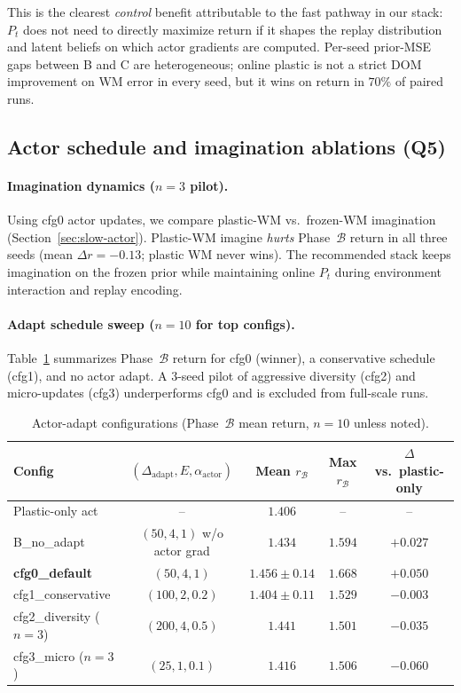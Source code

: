 This is the clearest \emph{control} benefit attributable to the fast pathway in our stack: $P_t$ does not need to directly maximize return if it shapes the replay distribution and latent beliefs on which actor gradients are computed.
Per-seed prior-MSE gaps between B and C are heterogeneous; online plastic is not a strict DOM improvement on WM error in every seed, but it wins on return in $70\%$ of paired runs.

\subsection{Actor schedule and imagination ablations (Q5)}
\label{sec:exp-actor-sweep}

\paragraph{Imagination dynamics ($n{=}3$ pilot).}
Using cfg0 actor updates, we compare plastic-WM vs.\ frozen-WM imagination (Section~\ref{sec:slow-actor}).
Plastic-WM imagine \emph{hurts} Phase~$\mathcal{B}$ return in all three seeds (mean $\Delta r = -0.13$; plastic WM never wins).
The recommended stack keeps imagination on the frozen prior while maintaining online $P_t$ during environment interaction and replay encoding.

\paragraph{Adapt schedule sweep ($n{=}10$ for top configs).}
Table~\ref{tab:cfg-sweep} summarizes Phase~$\mathcal{B}$ return for cfg0 (winner), a conservative schedule (cfg1), and no actor adapt.
A $3$-seed pilot of aggressive diversity (cfg2) and micro-updates (cfg3) underperforms cfg0 and is excluded from full-scale runs.

\begin{table}[t]
  \centering
  \caption{Actor-adapt configurations (Phase~$\mathcal{B}$ mean return, $n{=}10$ unless noted).}
  \label{tab:cfg-sweep}
  \begin{tabular}{@{}lcccc@{}}
    \toprule
    Config & $(\Delta_{\mathrm{adapt}}, E, \alpha_{\mathrm{actor}})$ & Mean $r_{\mathcal{B}}$ & Max $r_{\mathcal{B}}$ & $\Delta$ vs.\ plastic-only \\
    \midrule
    Plastic-only act & -- & $1.406$ & -- & -- \\
    B\_no\_adapt & $(50,4,1)$ w/o actor grad & $1.434$ & $1.594$ & $+0.027$ \\
  \textbf{cfg0\_default} & $(50,4,1)$ & $\mathbf{1.456 \pm 0.14}$ & $\mathbf{1.668}$ & $\mathbf{+0.050}$ \\
    cfg1\_conservative & $(100,2,0.2)$ & $1.404 \pm 0.11$ & $1.529$ & $-0.003$ \\
    cfg2\_diversity ($n{=}3$) & $(200,4,0.5)$ & $1.441$ & $1.501$ & $-0.035$ \\
    cfg3\_micro ($n{=}3$) & $(25,1,0.1)$ & $1.416$ & $1.506$ & $-0.060$ \\
    \bottomrule
  \end{tabular}
\end{table}

